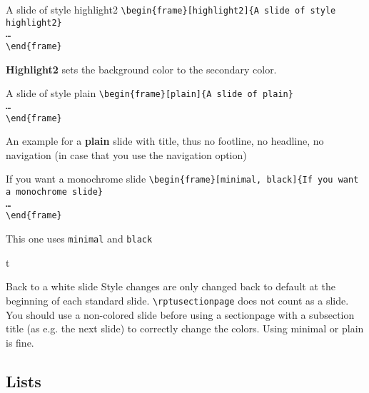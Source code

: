 \begin{frame}[highlight2]{A slide of style {\selectfont highlight2}}
	\texttt{\textbackslash begin\{frame\}[highlight2]\{A slide of style highlight2\} \\ \dots \\ \textbackslash end\{frame\}
	}
	
	\vspace{1ex}
	\textbf{Highlight2} sets the background color to the secondary color.
\end{frame}

\begin{frame}[plain]{A slide of style {\selectfont plain}}
\texttt{\textbackslash begin\{frame\}[plain]\{A slide of plain\} \\ \dots \\\textbackslash end\{frame\}
	}\vspace{1ex}
	
	An example for a \textbf{plain} slide with title, thus no footline, no headline, no navigation (in case that you use the navigation option)
\end{frame}

\begin{frame}{If you want a monochrome slide}
\texttt{\textbackslash begin\{frame\}[minimal, black]\{If you want a monochrome slide\} \\ \dots \\ \textbackslash end\{frame\}
	}\vspace{1ex}
	
	This one uses \texttt{minimal} and \texttt{black}
\end{frame}
t
\begin{frame}{Back to a white slide}
	Style changes are only changed back to default at the beginning of each standard slide. \texttt{\textbackslash rptusectionpage} does not count as a slide. You should use a non-colored slide before using a sectionpage with a subsection title (as e.g. the next slide) to correctly change the colors. Using minimal or plain is fine.
\end{frame}

\subsection{Lists}
\rptusectionpage

